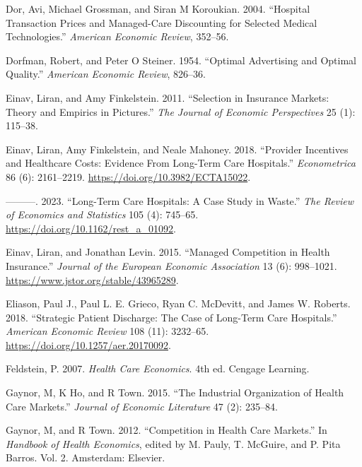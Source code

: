 \documentclass[
  letterpaper,
  DIV=11,
  numbers=noendperiod]{scrreport}
\newlength{\cslhangindent}
\newlength{\cslentryspacingunit} %
\newenvironment{CSLReferences}[2] %
 {%
  \setlength{\parindent}{0pt}
  \ifodd #1
  \let\oldpar\par
  \def\par{\hangindent=\cslhangindent\oldpar}
  \fi
  \setlength{\parskip}{#2\cslentryspacingunit}
 }%
 {}
\theoremstyle{definition}
\theoremstyle{remark}
\begin{document}
\begin{CSLReferences}{1}{0}
\leavevmode{}%
Dor, Avi, Michael Grossman, and Siran M Koroukian. 2004. {``Hospital
Transaction Prices and Managed-Care Discounting for Selected Medical
Technologies.''} \emph{American Economic Review}, 352--56.

\leavevmode{}%
Dorfman, Robert, and Peter O Steiner. 1954. {``Optimal Advertising and
Optimal Quality.''} \emph{American Economic Review}, 826--36.

\leavevmode{}%
Einav, Liran, and Amy Finkelstein. 2011. {``Selection in {Insurance}
{Markets}: {Theory} and {Empirics} in {Pictures}.''} \emph{The Journal
of Economic Perspectives} 25 (1): 115--38.

\leavevmode{}%
Einav, Liran, Amy Finkelstein, and Neale Mahoney. 2018. {``Provider
{Incentives} and {Healthcare} {Costs}: {Evidence} {From} {Long}-{Term}
{Care} {Hospitals}.''} \emph{Econometrica} 86 (6): 2161--2219.
\url{https://doi.org/10.3982/ECTA15022}.

\leavevmode{}%
---------. 2023. {``Long-{Term} {Care} {Hospitals}: {A} {Case} {Study}
in {Waste}.''} \emph{The Review of Economics and Statistics} 105 (4):
745--65. \url{https://doi.org/10.1162/rest_a_01092}.

\leavevmode{}%
Einav, Liran, and Jonathan Levin. 2015. {``Managed {Competition} in
{Health} {Insurance}.''} \emph{Journal of the European Economic
Association} 13 (6): 998--1021.
\url{https://www.jstor.org/stable/43965289}.

\leavevmode{}%
Eliason, Paul J., Paul L. E. Grieco, Ryan C. McDevitt, and James W.
Roberts. 2018. {``Strategic {Patient} {Discharge}: {The} {Case} of
{Long}-{Term} {Care} {Hospitals}.''} \emph{American Economic Review} 108
(11): 3232--65. \url{https://doi.org/10.1257/aer.20170092}.

\leavevmode{}%
Feldstein, P. 2007. \emph{Health {Care} {Economics}}. 4th ed. Cengage
Learning.

\leavevmode{}%
Gaynor, M, K Ho, and R Town. 2015. {``The {Industrial} {Organization} of
{Health} {Care} {Markets}.''} \emph{Journal of Economic Literature} 47
(2): 235--84.

\leavevmode{}%
Gaynor, M, and R Town. 2012. {``Competition in {Health} {Care}
{Markets}.''} In \emph{Handbook of {Health} {Economics}}, edited by M.
Pauly, T. McGuire, and P. Pita Barros. Vol. 2. Amsterdam: Elsevier.


\end{CSLReferences}
\end{document}
